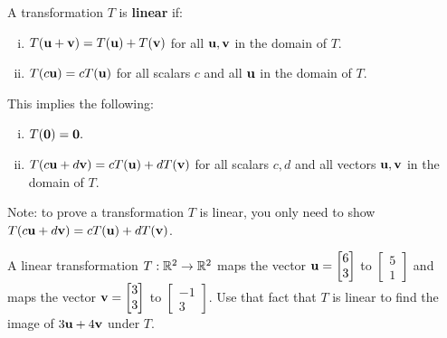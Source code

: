 \newpage


\begin{boxme}
	A transformation $T$ is \textbf{linear} if:
	\begin{enumerate}[(i)]\itemsep=0pt
		\item $T(\boldsymbol{\mathbf{u}}+\boldsymbol{\mathbf{v}}) = T(\boldsymbol{\mathbf{u}})+T(\boldsymbol{\mathbf{v}})$ for all $\boldsymbol{\mathbf{u}},\boldsymbol{\mathbf{v}}$ in the domain of $T$.
		\item $T(c\boldsymbol{\mathbf{u}}) = cT(\boldsymbol{\mathbf{u}})$ for all scalars $c$ and all $\boldsymbol{\mathbf{u}}$ in the domain of $T$.
	\end{enumerate}
	This implies the following:
	\begin{enumerate}[(i)]\itemsep=0pt
		\item $T(\boldsymbol{\mathbf{0}})=\boldsymbol{\mathbf{0}}.$
		\item $T(c\boldsymbol{\mathbf{u}}+d\boldsymbol{\mathbf{v}}) = cT(\boldsymbol{\mathbf{u}})+dT(\boldsymbol{\mathbf{v}})$ for all scalars $c,d$ and all vectors  $\boldsymbol{\mathbf{u}},\boldsymbol{\mathbf{v}}$ in the domain of $T$.
	\end{enumerate}
	Note: to prove a transformation $T$ is linear, you only need to show $T(c\boldsymbol{\mathbf{u}}+d\boldsymbol{\mathbf{v}}) = cT(\boldsymbol{\mathbf{u}})+dT(\boldsymbol{\mathbf{v}})$.
\end{boxme}

\begin{exercise} %
	A linear transformation $T:\mathbb{R}^2\to\mathbb{R}^2$ maps the vector $\boldsymbol{\mathbf{u}}=\begin{bmatrix}6\\3\end{bmatrix}$ to $\begin{bmatrix}5\\1\end{bmatrix}$ and maps the vector $\boldsymbol{\mathbf{v}}=\begin{bmatrix}3\\3\end{bmatrix}$ to $\begin{bmatrix}-1\\3\end{bmatrix}$. Use that fact that $T$ is linear to find the image of $3\boldsymbol{\mathbf{u}}+4\boldsymbol{\mathbf{v}}$ under $T$.
\end{exercise}
\vfill


